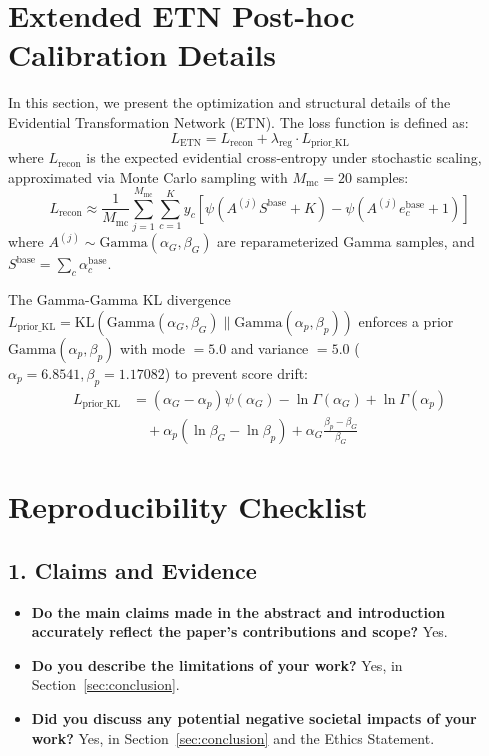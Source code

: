 \documentclass[letterpaper]{article} %
\begin{document}
\section{Extended ETN Post-hoc Calibration Details}\label{sec:appendix_etn}
In this section, we present the optimization and structural details of the Evidential Transformation Network (ETN). The loss function is defined as:
\begin{equation}
    L_{\text{ETN}} = L_{\text{recon}} + \lambda_{\text{reg}} \cdot L_{\text{prior\_KL}}
\end{equation}
where $L_{\text{recon}}$ is the expected evidential cross-entropy under stochastic scaling, approximated via Monte Carlo sampling with $M_{\text{mc}} = 20$ samples:
\begin{equation}
    L_{\text{recon}} \approx \frac{1}{M_{\text{mc}}} \sum_{j=1}^{M_{\text{mc}}} \sum_{c=1}^K y_c \left[ \psi\left(A^{(j)} S^{\text{base}} + K\right) - \psi\left(A^{(j)} e^{\text{base}}_c + 1\right) \right]
\end{equation}
where $A^{(j)} \sim \text{Gamma}(\alpha_G, \beta_G)$ are reparameterized Gamma samples, and $S^{\text{base}} = \sum_c \alpha^{\text{base}}_c$. 

The Gamma-Gamma KL divergence $L_{\text{prior\_KL}} = \text{KL}(\text{Gamma}(\alpha_G, \beta_G) \parallel \text{Gamma}(\alpha_p, \beta_p))$ enforces a prior $\text{Gamma}(\alpha_p, \beta_p)$ with mode $= 5.0$ and variance $= 5.0$ ($\alpha_p = 6.8541, \beta_p = 1.17082$) to prevent score drift:
\begin{align}
    L_{\text{prior\_KL}} &= (\alpha_G - \alpha_p)\psi(\alpha_G) - \ln\Gamma(\alpha_G) + \ln\Gamma(\alpha_p) \nonumber \\
    &\quad + \alpha_p (\ln\beta_G - \ln\beta_p) + \alpha_G \frac{\beta_p - \beta_G}{\beta_G}
\end{align}




\section*{Reproducibility Checklist}

\subsection*{1. Claims and Evidence}
\begin{itemize}
    \item \textbf{Do the main claims made in the abstract and introduction accurately reflect the paper's contributions and scope?} Yes.
    \item \textbf{Do you describe the limitations of your work?} Yes, in Section~\ref{sec:conclusion}.
    \item \textbf{Did you discuss any potential negative societal impacts of your work?} Yes, in Section~\ref{sec:conclusion} and the Ethics Statement.
\end{itemize}
\end{document}
